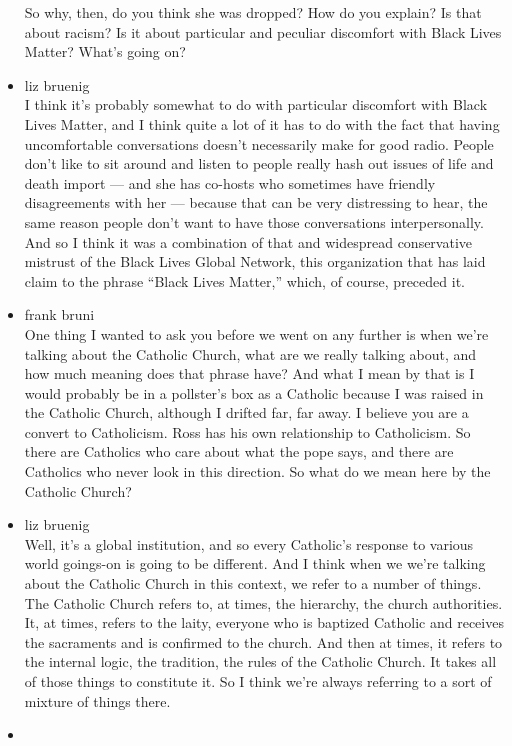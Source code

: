 \begin{itemize}
  So why, then, do you think she was dropped? How do you explain? Is
  that about racism? Is it about particular and peculiar discomfort with
  Black Lives Matter? What's going on?
\item
  liz bruenig\\
  I think it's probably somewhat to do with particular discomfort with
  Black Lives Matter, and I think quite a lot of it has to do with the
  fact that having uncomfortable conversations doesn't necessarily make
  for good radio. People don't like to sit around and listen to people
  really hash out issues of life and death import --- and she has
  co-hosts who sometimes have friendly disagreements with her ---
  because that can be very distressing to hear, the same reason people
  don't want to have those conversations interpersonally. And so I think
  it was a combination of that and widespread conservative mistrust of
  the Black Lives Global Network, this organization that has laid claim
  to the phrase ``Black Lives Matter,'' which, of course, preceded it.
\item
  frank bruni\\
  One thing I wanted to ask you before we went on any further is when
  we're talking about the Catholic Church, what are we really talking
  about, and how much meaning does that phrase have? And what I mean by
  that is I would probably be in a pollster's box as a Catholic because
  I was raised in the Catholic Church, although I drifted far, far away.
  I believe you are a convert to Catholicism. Ross has his own
  relationship to Catholicism. So there are Catholics who care about
  what the pope says, and there are Catholics who never look in this
  direction. So what do we mean here by the Catholic Church?
\item
  liz bruenig\\
  Well, it's a global institution, and so every Catholic's response to
  various world goings-on is going to be different. And I think when we
  we're talking about the Catholic Church in this context, we refer to a
  number of things. The Catholic Church refers to, at times, the
  hierarchy, the church authorities. It, at times, refers to the laity,
  everyone who is baptized Catholic and receives the sacraments and is
  confirmed to the church. And then at times, it refers to the internal
  logic, the tradition, the rules of the Catholic Church. It takes all
  of those things to constitute it. So I think we're always referring to
  a sort of mixture of things there.
\item

\end{itemize}
